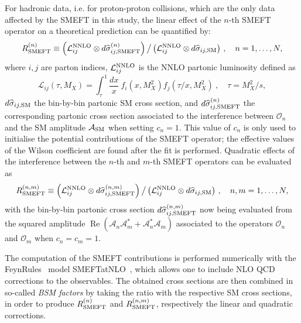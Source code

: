 \documentclass[withindex,glossary]{cam-thesis}
\renewcommand{\Re}{\operatorname{Re}} %
\begin{document}
For hadronic data, i.e. for proton-proton collisions, which are the only data affected by the SMEFT in this study,
 the linear effect of the $n$-th SMEFT operator on a theoretical prediction can be quantified by:
%
\begin{equation}
  \label{eq:mult_k_fac_app1}
   R_{\rm SMEFT}^{(n)} \equiv \displaystyle \left( {\cal L}_{ ij}^{\rm NNLO} \otimes d\widehat{\sigma}_{ij,{\rm SMEFT}}^{(n)}\right)
 \big/ \left( {\cal L}_{ ij}^{\rm NNLO} \otimes d\widehat{\sigma}_{ij,{\rm SM}} \right) \, , \quad
 n=1,\ldots, N,
\end{equation}
%
where $i, j$ are parton indices, ${\cal L}_{ ij}^{\rm NNLO}$ is the NNLO partonic luminosity defined as 
%
\begin{equation}
\label{eq:lumidef}
\mathcal{L}_{ij}(\tau,M_X) = \int_{\tau}^1 \frac{d x}{x}~f_i (x,M_X^2) f_j (\tau/x,M_X^2) ~, \quad \tau=M_X^2/s,
\end{equation}
%
$d\widehat{\sigma}_{ij,{\rm SM}}$ the bin-by-bin partonic SM cross section, and $d\widehat{\sigma}_{ij,{\rm SMEFT}}^{(n)}$
the corresponding partonic cross section associated to the interference between 
$\mathcal{O}_n$ and the SM amplitude $\mathcal{A}_{\rm SM}$ when setting $c_n = 1$. This value of $c_n$ 
is only used to initialise the potential contributions of the
SMEFT operator; the effective values of the Wilson coefficient 
are found after the fit is performed. 
%
Quadratic effects of the interference between the $n$-th and $m$-th
SMEFT operators can be evaluated as
%
\begin{equation}
  \label{eq:mult_k_fac_app2}
  R_{\rm SMEFT}^{(n,m)} \equiv \displaystyle \left( {\cal L}_{ ij}^{\rm NNLO} \otimes d\widehat{\sigma}_{ij,{\rm SMEFT}}^{(n,m)}\right)
  \big/ \left( {\cal L}_{ ij}^{\rm NNLO} \otimes d\widehat{\sigma}_{ij,{\rm SM}} \right) \, , \quad
 n,m=1, \ldots, N  ,
\end{equation}
with the bin-by-bin partonic cross section
$d\widehat{\sigma}_{ij,{\rm SMEFT}}^{(n,m)}$ now being evaluated from the squared amplitude $\Re(\mathcal{A}_n\mathcal{A}_m^* + \mathcal{A}_n^* \mathcal{A}_m)$
associated to the operators $\mathcal{O}_n$ and $\mathcal{O}_m$ when $c_n = c_m = 1$.

The computation of the SMEFT contributions is
performed numerically with the FeynRules~\cite{Alloul:2013bka} model SMEFTatNLO~\cite{Degrande:2020evl}, which allows one to include NLO QCD corrections to the observables. The obtained cross sections are then combined in so-called \textit{BSM factors} by taking the ratio with the respective SM cross sections, in order to 
produce $R_{\rm SMEFT}^{(n)}$ and $R_{\rm SMEFT}^{(n,m)}$, respectively the linear and quadratic corrections.
\end{document}
